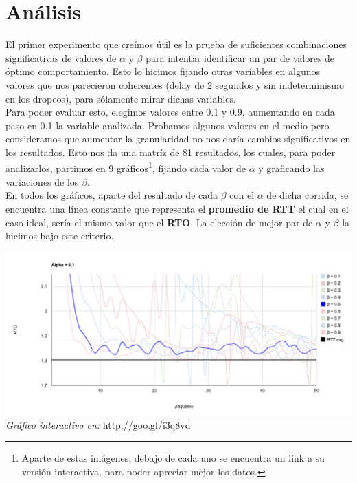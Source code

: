 \section{Análisis}

El primer experimento que creímos útil es la prueba de suficientes combinaciones significativas de valores de $\alpha$ y $\beta$ para intentar identificar un par de valores de óptimo comportamiento. Esto lo hicimos fijando otras variables en algunos valores que nos parecieron coherentes (delay de 2 segundos y sin indeterminismo en los dropeos), para sólamente mirar dichas variables.\\

\indent Para poder evaluar esto, elegimos valores entre 0.1 y 0.9, aumentando en cada paso en 0.1 la variable analizada. Probamos algunos valores en el medio pero consideramos que aumentar la granularidad no nos daría cambios significativos en los resultados. Esto nos da una matríz de 81 resultados, los cuales, para poder analizarlos, partimos en 9 gráficos\footnote{Aparte de estas imágenes, debajo de cada uno se encuentra un link a su versión interactiva, para poder apreciar mejor los datos.}, fijando cada valor de $\alpha$ y graficando las variaciones de los $\beta$.\\

\indent En todos los gráficos, aparte del resultado de cada $\beta$ con el $\alpha$ de dicha corrida, se encuentra una línea constante que representa el \textbf{promedio de RTT} el cual en el caso ideal, sería el mismo valor que el \textbf{RTO}. La elección de mejor par de $\alpha$ y $\beta$ la hicimos bajo este criterio.

\begin{center}
	\includegraphics[scale=0.35]{graphics/rto_vs_paquetes_a_1.png}
	\textit{Gráfico interactivo en:} http://goo.gl/i3q8vd
\end{center}

